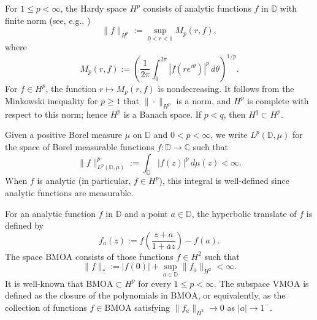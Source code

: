 \documentclass[preprint,12pt]{elsarticle}
\numberwithin{equation}{section}
\theoremstyle{remark}
\begin{document}
For $1\le p<\infty$, the Hardy space $H^p$ consists of analytic functions
$f$ in $\mathbb{D}$ with finite norm (see, e.g., \cite[p.~48]{Garnett-book})
\begin{equation}\label{Hardy-norm}
\|f\|_{H^p} := \sup_{0<r<1} M_p(r,f),
\end{equation}
where
\begin{equation}\label{M-p}
M_p(r,f):=\left( \frac{1}{2\pi}\int_0^{2\pi} |f(re^{i\theta})|^p\,d\theta\right)^{1/p}.
\end{equation}
For $f\in H^p$, the function $r\mapsto M_p(r,f)$ is nondecreasing. It follows from the
Minkowski inequality for $p\ge 1$ that $\|\cdot\|_{H^p}$ is a norm, and $H^p$ is complete
with respect to this norm; hence $H^p$ is a Banach space. If $p<q$, then
$H^q\subset H^p$.

\medskip
Given a positive Borel measure $\mu$ on $\mathbb D$ and $0<p<\infty$, we write
$L^p(\mathbb D,\mu)$ for the space of Borel measurable functions
$f:\mathbb D\to\mathbb C$ such that
\begin{equation*}
\|f\|_{L^p(\mathbb D,\mu)}^p:=\int_{\mathbb D}|f(z)|^p\,d\mu(z)<\infty.
\end{equation*}
When $f$ is analytic (in particular, $f\in H^p$), this integral is well-defined since analytic functions are measurable.


For an analytic function $f$ in $\mathbb{D}$ and a point $a\in\mathbb{D}$,
the hyperbolic translate of $f$ is defined by
\begin{equation*}
f_a(z):=f\!\left(\frac{z+a}{1+\overline a z}\right)-f(a).
\end{equation*}
The space $\mathrm{BMOA}$ consists of those functions $f\in H^2$ such that
\begin{equation*}
\|f\|_*:=|f(0)|+\sup_{a\in\mathbb{D}}\|f_a\|_{H^2}<\infty.
\end{equation*}
It is well-known that $\mathrm{BMOA}\subset H^p$ for every $1\le p<\infty$.
The subspace $\mathrm{VMOA}$ is defined as the closure of the polynomials in
$\mathrm{BMOA}$, or equivalently, as the collection of functions $f\in\mathrm{BMOA}$
satisfying $\|f_a\|_{H^2}\to0$ as $|a|\to1^{-}$.
\end{document}
